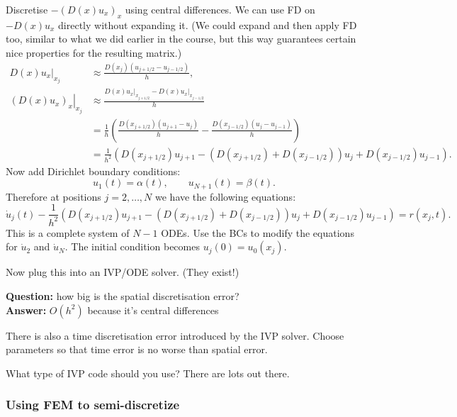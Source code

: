 \documentclass[12pt, a4paper]{article}
\theoremstyle{definition}
\theoremstyle{remark}
\numberwithin{equation}{section}
\begin{document}
Discretise $-(D(x)u_x)_x$ using central differences. We can use FD on
$-D(x)u_x$ directly without expanding it. (We could expand and then apply
FD too, similar to what we did earlier in the course, but this way
guarantees certain nice properties for the resulting matrix.)
\begin{align*}
\left.D(x)u_x\right|_{x_j} &\approx \frac{D(x_j)(u_{j+1/2} - u_{j - 1/2})}{h}, \\
\left.(D(x)u_x)_x\right|_{x_j} &\approx \frac{\left.D(x)u_x\right|_{x_{j+1/2}} - \left.D(x)u_x\right|_{x_{j-1/2}}}{h} \\
&= \frac{1}{h}\left( \frac{D(x_{j+1/2})(u_{j+1} - u_{j})}{h} - \frac{D(x_{j-1/2})(u_{j} - u_{j - 1})}{h}\right) \\
&= \frac{1}{h^2}\left( D(x_{j+1/2})u_{j+1} - (D(x_{j+1/2}) + D(x_{j-1/2}))u_j + D(x_{j-1/2})u_{j-1} \right).
\end{align*}
Now add Dirichlet boundary conditions:
$$ u_1(t) = \alpha(t), \qquad u_{N+1}(t) = \beta(t). $$
Therefore at positions $j=2,\ldots,N$ we have the following equations:
$$ \dot{u}_j(t) - \frac{1}{h^2}\left( D(x_{j+1/2})u_{j+1} - (D(x_{j+1/2}) + D(x_{j-1/2}))u_j + D(x_{j-1/2})u_{j-1} \right) = r(x_j,t). $$
This is a complete system of $N-1$ ODEs. Use the BCs to modify the equations
for $\dot{u}_2$ and $\dot{u}_{N}$. The initial condition becomes $u_j(0) = u_0(x_j)$.

Now plug this into an IVP/ODE solver. (They exist!)


\textbf{Question:} how big is the spatial discretisation error? \\
\textbf{Answer:} $O(h^2)$ because it's central differences



There is also a time discretisation error introduced by the IVP solver.
Choose parameters so that time error is no worse than spatial error.

What type of IVP code should you use? There are lots out there. 

\newpage
\subsubsection{Using FEM to semi-discretize}
\end{document}
